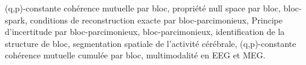 (q,p)-constante cohérence mutuelle par bloc,
propriété null space par bloc,
bloc-spark,
conditions de reconstruction exacte par bloc-parcimonieux,
Principe d'incertitude par bloc-parcimonieux,
bloc-parcimonieux,
identification de la structure de bloc,
segmentation spatiale de l’activité cérébrale,
(q,p)-constante cohérence mutuelle cumulée par bloc,
multimodalité en EEG et MEG.